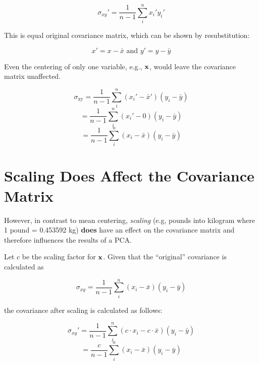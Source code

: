 \documentclass[fleqn]{article}
\begin{document}
\begin{equation} \sigma_{xy}' = \frac{1}{n-1} \sum_{i}^{n} x_i' y_i'   \end{equation} 


\noindent This is equal original covariance matrix, which can be shown by resubstitution:

\begin{equation} x' = x - \bar{x} \text{ and } y' = y - \bar{y} \end{equation}

\noindent Even the centering of only one variable,  e.g., $\bf{x}$,  would leave the covariance matrix unaffected. 

\begin{equation} \sigma_{\text{xy}} = \frac{1}{n-1} \sum_{i}^{n} (x_i' - \bar{x}')(y_i - \bar{y})   \end{equation}
\begin{equation}  =  \frac{1}{n-1} \sum_{i}^{n} (x_i' - 0)(y_i - \bar{y})   \end{equation}
\begin{equation}  =  \frac{1}{n-1} \sum_{i}^{n} (x_i - \bar{x})(y_i - \bar{y})   \end{equation}



\section{Scaling Does Affect the Covariance Matrix}
\label{scalingofvariablesdoesaffectthecovariancematrix}

However, in contrast to mean centering, \emph{scaling} (e.g, pounds into kilogram where 1 pound = 0.453592 kg) \textbf{does} have an effect on the covariance matrix and therefore influences the results of a PCA.

\noindent Let $c$ be the scaling factor for $\bf{x}$. Given that the ``original'' covariance is calculated as

\begin{equation} \sigma_{xy} = \frac{1}{n-1} \sum_{i}^{n} (x_i - \bar{x})(y_i - \bar{y})   \end{equation}

\noindent the covariance after scaling is calculated as follows:

\begin{equation} \sigma_{xy}' = \frac{1}{n-1} \sum_{i}^{n} (c \cdot x_i - c \cdot  \bar{x})(y_i - \bar{y})   \end{equation}
\begin{equation} =  \frac{c}{n-1} \sum_{i}^{n} (x_i -   \bar{x})(y_i - \bar{y})   \end{equation}
\end{document}
